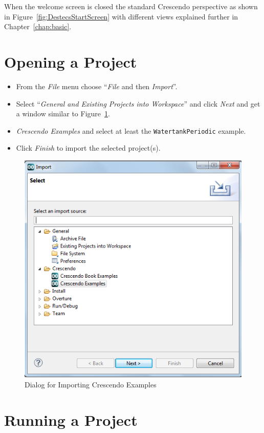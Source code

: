 \documentclass{crescendorepchap}
\begin{document}
When the welcome screen is closed the standard Crescendo perspective as shown in Figure~\ref{fig:DestecsStartScreen} with different views explained further in Chapter~\ref{chap:basic}.

\section{Opening a Project}

\begin{itemize}
\item
  From the \emph{File} menu choose ``\emph{File} and then \emph{Import}''.
\item
  Select ``\emph{General and Existing Projects into Workspace}''
  and click \emph{Next} and get a window similar to Figure~\ref{fig:importex}.
\item
  \emph{Crescendo Examples} and select at least the
  \texttt{WatertankPeriodic} example.
\item
  Click \emph{Finish} to import the selected project(s).
\end{itemize}

\begin{figure}[htbp]
\centering
\includegraphics[width=.8\textwidth]{images/DestecsImportDialog.png}
\caption{Dialog for Importing Crescendo Examples\label{fig:importex}}
\end{figure}

\section{Running a Project}
\end{document}
